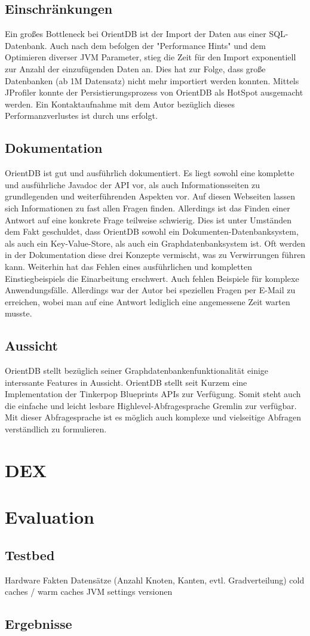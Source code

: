 \documentclass[11pt, a4paper, oneside, twocolumn]{article} %
\begin{document}
\subsection{Einschränkungen}
Ein großes Bottleneck bei OrientDB ist der Import der Daten aus einer SQL-Datenbank. Auch nach dem befolgen der "Performance Hints" und dem Optimieren diverser JVM Parameter, stieg die Zeit für den Import exponentiell zur Anzahl der einzufügenden Daten an. Dies hat zur Folge, dass große Datenbanken (ab 1M Datensatz) nicht mehr importiert werden konnten. Mittels JProfiler konnte der Persistierungsprozess von OrientDB als HotSpot ausgemacht werden. Ein Kontaktaufnahme mit dem Autor bezüglich dieses Performanzverlustes ist durch uns erfolgt.

\subsection{Dokumentation}
OrientDB ist gut und ausführlich dokumentiert. Es liegt sowohl eine komplette und ausführliche Javadoc der API vor, als auch Informationsseiten zu grundlegenden und weiterführenden Aspekten vor. Auf diesen Webseiten lassen sich Informationen zu fast allen Fragen finden. Allerdings ist das Finden einer Antwort auf eine konkrete Frage teilweise schwierig. Dies ist unter Umständen dem Fakt geschuldet, dass OrientDB sowohl ein Dokumenten-Datenbanksystem, als auch ein Key-Value-Store, als auch ein Graphdatenbanksystem ist. Oft werden in der Dokumentation diese drei Konzepte vermischt, was zu Verwirrungen führen kann. Weiterhin hat das Fehlen eines ausführlichen und kompletten Einstiegbeispiels die Einarbeitung erschwert. Auch fehlen Beispiele für komplexe Anwendungsfälle. Allerdings war der Autor bei speziellen Fragen per E-Mail zu erreichen, wobei man auf eine Antwort lediglich eine angemessene Zeit warten musste.

\subsection{Aussicht}
OrientDB stellt bezüglich seiner Graphdatenbankenfunktionalität einige interssante Features in Aussicht. OrientDB stellt seit Kurzem eine Implementation der Tinkerpop Blueprints APIs zur Verfügung. Somit steht auch die einfache und leicht lesbare Highlevel-Abfragesprache Gremlin zur verfügbar. Mit dieser Abfragesprache ist es möglich auch komplexe und vielseitige Abfragen verständlich zu formulieren.


\section{DEX}

\section{Evaluation}

\subsection{Testbed}

Hardware Fakten
Datensätze (Anzahl Knoten, Kanten, evtl. Gradverteilung)
cold caches / warm caches
JVM settings
versionen

\subsection{Ergebnisse}
\end{document}
